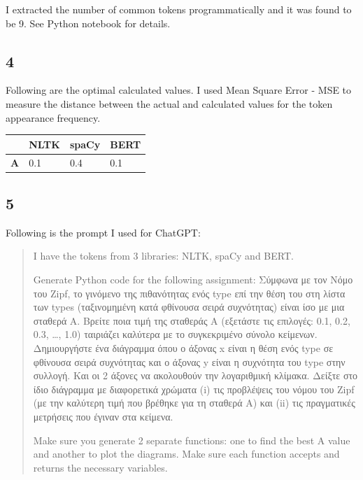 \documentclass[8pt,a4paper]{report}%
\begin{document}
I extracted the number of common tokens programmatically and it was found to be 9. See Python notebook for details.

\subsection*{4}

Following are the optimal calculated values. I used Mean Square Error - MSE to measure the distance between the actual and calculated values for the token appearance frequency.

\begin{table}[H]
\begin{tabular}{|c|l|l|l|}
\hline
\multicolumn{1}{|r|}{\textbf{}} & \multicolumn{1}{r|}{\textbf{NLTK}} & \multicolumn{1}{r|}{\textbf{spaCy}} & \multicolumn{1}{r|}{\textbf{BERT}} \\ \hline
\textbf{A}                      & 0.1                                & 0.4                                 & 0.1                                \\ \hline
\end{tabular}
\end{table}

\subsection*{5}


Following is the prompt I used for ChatGPT:


\begin{quote}
I have the tokens from 3 libraries: NLTK, spaCy and BERT.

Generate Python code for the following assignment:
Σύμφωνα με τον Νόμο του Zipf, το γινόμενο της πιθανότητας ενός type επί την θέση του στη λίστα των types (ταξινομημένη κατά φθίνουσα σειρά συχνότητας) είναι ίσο με μια σταθερά Α. Βρείτε ποια τιμή της σταθεράς A (εξετάστε τις επιλογές: 0.1, 0.2, 0.3, …, 1.0) ταιριάζει καλύτερα με το συγκεκριμένο σύνολο κείμενων. Δημιουργήστε ένα διάγραμμα όπου ο άξονας x είναι η θέση ενός type σε φθίνουσα σειρά συχνότητας και ο άξονας y είναι η συχνότητα του type στην συλλογή. Και οι 2 άξονες να ακολουθούν την λογαριθμική κλίμακα. Δείξτε στο ίδιο διάγραμμα με διαφορετικά χρώματα (i) τις προβλέψεις του νόμου του Zipf (με την καλύτερη τιμή που βρέθηκε για τη σταθερά Α) και (ii) τις πραγματικές μετρήσεις που έγιναν στα κείμενα.

Make sure you generate 2 separate functions: one to find the best A value and another to plot the diagrams. Make sure each function accepts and returns the necessary variables.

\end{quote}
\end{document}
